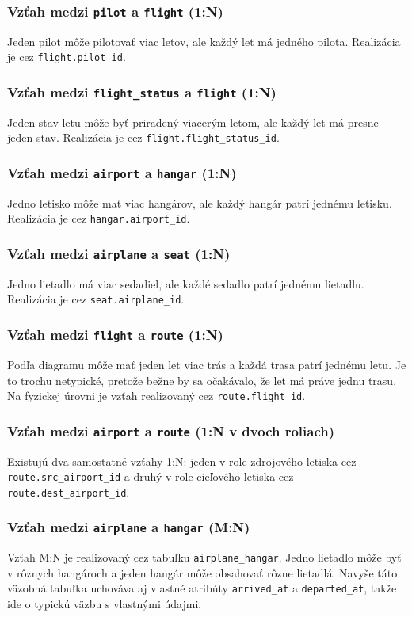 \documentclass[11pt, a4paper]{article}
\begin{document}
\subsubsection*{Vzťah medzi \texttt{pilot} a \texttt{flight} (1:N)}
Jeden pilot môže pilotovať viac letov, ale každý let má jedného pilota.
Realizácia je cez \texttt{flight.pilot\_id}.

\subsubsection*{Vzťah medzi \texttt{flight\_status} a \texttt{flight} (1:N)}
Jeden stav letu môže byť priradený viacerým letom, ale každý let má presne
jeden stav. Realizácia je cez \texttt{flight.flight\_status\_id}.

\subsubsection*{Vzťah medzi \texttt{airport} a \texttt{hangar} (1:N)}
Jedno letisko môže mať viac hangárov, ale každý hangár patrí jednému letisku.
Realizácia je cez \texttt{hangar.airport\_id}.

\subsubsection*{Vzťah medzi \texttt{airplane} a \texttt{seat} (1:N)}
Jedno lietadlo má viac sedadiel, ale každé sedadlo patrí jednému lietadlu.
Realizácia je cez \texttt{seat.airplane\_id}.

\subsubsection*{Vzťah medzi \texttt{flight} a \texttt{route} (1:N)}
Podľa diagramu môže mať jeden let viac trás a každá trasa patrí jednému letu.
Je to trochu netypické, pretože bežne by sa očakávalo, že let má práve jednu
trasu. Na fyzickej úrovni je vzťah realizovaný cez \texttt{route.flight\_id}.

\subsubsection*{Vzťah medzi \texttt{airport} a \texttt{route} (1:N v dvoch roliach)}
Existujú dva samostatné vzťahy 1:N: jeden v role zdrojového letiska cez
\texttt{route.src\_airport\_id} a druhý v role cieľového letiska cez
\texttt{route.dest\_airport\_id}.

\subsubsection*{Vzťah medzi \texttt{airplane} a \texttt{hangar} (M:N)}
Vzťah M:N je realizovaný cez tabuľku \texttt{airplane\_hangar}. Jedno lietadlo
môže byť v rôznych hangároch a jeden hangár môže obsahovať rôzne lietadlá.
Navyše táto väzobná tabuľka uchováva aj vlastné atribúty
\texttt{arrived\_at} a \texttt{departed\_at}, takže ide o typickú väzbu s
vlastnými údajmi.
\end{document}
